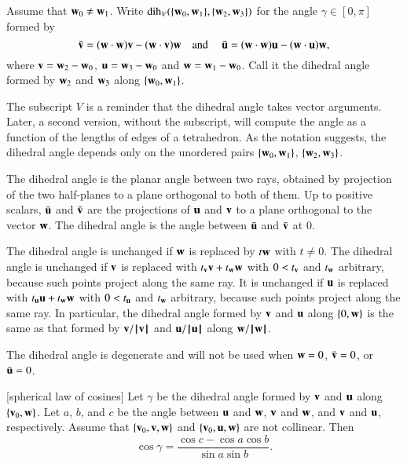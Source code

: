 \begin{definition}\label{def:dih} Assume that ${\mathbf w}_0\ne {\mathbf w}_1$.
Write $\operatorname{dih}_V(\{{\mathbf w}_0,{\mathbf w}_1\},\{{\mathbf w}_2,{\mathbf w}_3\})$ for the angle $\gamma\in[0,\pi]$
formed
by 
    $$
    \bar {{\mathbf v}} = ({\mathbf w}\cdot {\mathbf w}) {\mathbf v} - ({\mathbf w}\cdot {\mathbf v}) {\mathbf w}\quad\text{and }\quad \bar {{\mathbf u}} =
            ({\mathbf w}\cdot {\mathbf w}) {\mathbf u} - ({\mathbf w}\cdot {\mathbf u}) {\mathbf w},
    $$
where ${\mathbf v} = {\mathbf w}_2-{\mathbf w}_0$, ${\mathbf u}={\mathbf w}_3-{\mathbf w}_0$ and ${\mathbf w}={\mathbf w}_1-{\mathbf w}_0$.  Call it
the dihedral angle formed by ${\mathbf w}_2$ and ${\mathbf w}_3$ along $\{{\mathbf w}_0,{\mathbf w}_1\}$.
%
%
\end{definition}
The subscript $V$ is a reminder 
that the dihedral angle takes vector arguments.
Later, a second version, without the subscript, will
compute the angle as a function of the lengths of edges of a 
tetrahedron.
%
%
As the notation suggests, the dihedral angle depends only
on the unordered pairs $\{{\mathbf w}_0,{\mathbf w}_1\}$, $\{{\mathbf w}_2,{\mathbf w}_3\}$.

The dihedral angle is the planar angle between two rays, obtained by projection of the two half-planes to a plane orthogonal to both of them.
Up to positive scalars, $\bar {{\mathbf u}}$ and $\bar {{\mathbf v}}$ are the projections of
${\mathbf u}$ and ${\mathbf v}$ to a plane orthogonal to the vector ${\mathbf w}$.  The
dihedral angle is the angle between $\bar {{\mathbf u}}$ and $\bar {{\mathbf v}}$ at $0$.

The dihedral angle is unchanged if ${\mathbf w}$ is replaced by $t {\mathbf w}$ with
$t\ne0$. The dihedral angle is unchanged if ${\mathbf v}$ is replaced with
$t_{\mathbf v} {\mathbf v} + t_{\mathbf w} {\mathbf w}$ with $0 < t_{\mathbf v}$ and $t_{\mathbf w}$ arbitrary, because such points project along the same ray.  
It is unchanged if
${\mathbf u}$ is replaced with $t_{\mathbf u} {\mathbf u} + t_{\mathbf w} {\mathbf w}$ with $0 < t_{\mathbf u}$ and $t_{\mathbf w}$
arbitrary, because such points project along the same ray.  In particular, the dihedral angle formed by ${\mathbf v}$ and
${\mathbf u}$ along $\{0,{\mathbf w}\}$ is the same as that formed by ${\mathbf v}/{{\hskip0.1em|\hskip-0.15em|\hskip0.1em}{\mathbf v}{\hskip0.1em|\hskip-0.15em|\hskip0.1em}}$ and
${\mathbf u}/{{\hskip0.1em|\hskip-0.15em|\hskip0.1em}{\mathbf u}{\hskip0.1em|\hskip-0.15em|\hskip0.1em}}$ along ${\mathbf w}/{{\hskip0.1em|\hskip-0.15em|\hskip0.1em}{\mathbf w}{\hskip0.1em|\hskip-0.15em|\hskip0.1em}}$.

The dihedral angle is degenerate and will not be used when ${\mathbf w} =
0$, $\bar {{\mathbf v}} = 0$, or $\bar {{\mathbf u}} = 0$.




\begin{lemma}[spherical law of cosines]\label{lemma:sloc}
Let $\gamma$ be the dihedral angle formed by ${\mathbf v}$ and ${\mathbf u}$ along
$\{{\mathbf v}_0,{\mathbf w}\}$.  Let $a$, $b$, and $c$ be the
angle between ${\mathbf u}$ and ${\mathbf w}$, ${\mathbf v}$ and ${\mathbf w}$, and ${\mathbf v}$ and
${\mathbf u}$, respectively. %
Assume that $\{{\mathbf v}_0,{\mathbf v},{\mathbf w}\}$ and $\{{\mathbf v}_0,{\mathbf u},{\mathbf w}\}$ are not collinear.
Then
    $$\cos\gamma = \frac{\cos c - \cos a \cos b}{\sin a\sin b}.$$
\end{lemma}
%
%
%

